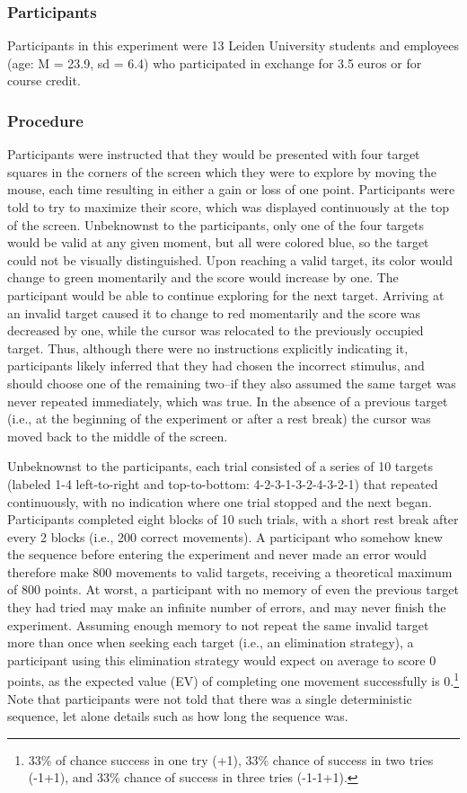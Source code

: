 \documentclass[man,floatsintext]{apa6}
\begin{document}
\subsubsection{Participants}

Participants in this experiment were 13 Leiden University students and employees (age: M = 23.9, sd = 6.4) who participated in exchange for 3.5 euros or for course credit.

\subsubsection{Procedure}
 
Participants were instructed that they would be presented with four target squares in the corners of the screen which they were to explore by moving the mouse, each time resulting in either a gain or loss of one point. Participants were told to try to maximize their score, which was displayed continuously at the top of the screen. Unbeknownst to the participants, only one of the four targets would be valid at any given moment, but all were colored blue, so the target could not be visually distinguished. Upon reaching a valid target, its color would change to green momentarily and the score would increase by one. The participant would be able to continue exploring for the next target. Arriving at an invalid target caused it to change to red momentarily and the score was decreased by one, while the cursor was relocated to the previously occupied target. Thus, although there were no instructions explicitly indicating it, participants likely inferred that they had chosen the incorrect stimulus, and should choose one of the remaining two--if they also assumed the same target was never repeated immediately, which was true. In the absence of a previous target (i.e., at the beginning of the experiment or after a rest break) the cursor was moved back to the middle of the screen.

Unbeknownst to the participants, each trial consisted of a series of 10 targets (labeled 1-4 left-to-right and top-to-bottom: 4-2-3-1-3-2-4-3-2-1) that repeated continuously, with no indication where one trial stopped and the next began. Participants completed eight blocks of 10 such trials,  with a short rest break after every 2 blocks (i.e., 200 correct movements). A participant who somehow knew the sequence before entering the experiment and never made an error would therefore make 800 movements to valid targets, receiving a theoretical maximum of 800 points. At worst, a participant with no memory of even the previous target they had tried may make an infinite number of errors, and may never finish the experiment. Assuming enough memory to not repeat the same invalid target more than once when seeking each target (i.e., an elimination strategy), a participant using this elimination strategy would expect on average to score 0 points, as the expected value (EV) of completing one movement successfully is 0.\footnote{33\% of chance success in one try (+1), 33\% chance of success in two tries (-1+1), and 33\% chance of success in three tries (-1-1+1).} Note that participants were not told that there was a single deterministic sequence, let alone details such as how long the sequence was. 
\end{document}
